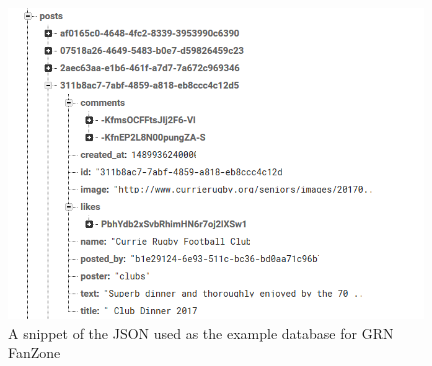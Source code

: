 \begin{figure}[H]
\begin{center}
\includegraphics[width=11cm]{figures/backend_dbexample}
\end{center}
\caption{A snippet of the JSON used as the example database for GRN FanZone}
\label{fig:backend_dbexample}
\end{figure}
